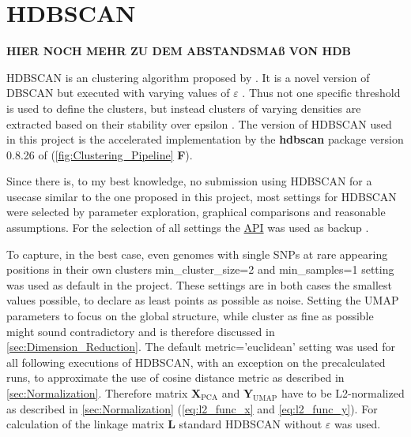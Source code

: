 \section{HDBSCAN} \label{sec:HDBSCAN}

\textbf{HIER NOCH MEHR ZU DEM ABSTANDSMAß VON HDB}

\gls{HDBSCAN} is an clustering algorithm proposed by \textcite{campello_hierarchical_2015, hutchison_density-based_2013}. It is a novel version of \gls{DBSCAN} but executed with varying values of $\varepsilon$ \autocite{hutchison_density-based_2013}. Thus not one specific threshold is used to define the clusters, but instead clusters of varying densities are extracted based on their stability over epsilon \autocite{mcinnes_hdbscan_2017}. The version of \gls{HDBSCAN} used in this project is the accelerated implementation by the \textbf{hdbscan} package version 0.8.26 of \textcite{mcinnes_accelerated_2017} (\autoref{fig:Clustering_Pipeline} \textsf{\textbf{F}}).

Since there is, to my best knowledge, no submission using \gls{HDBSCAN} for a usecase similar to the one proposed in this project, most settings for \gls{HDBSCAN} were selected by parameter exploration, graphical comparisons and reasonable assumptions. For the selection of all settings the \href{https://hdbscan.readthedocs.io/en/latest/api.html}{API} was used as backup \autocite{mcinnes_hdbscan_2017}. 

To capture, in the best case, even genomes with single \glspl{SNP} at rare appearing positions in their own clusters \colorbox{backcolour}{min\_cluster\_size=2} and \colorbox{backcolour}{min\_samples=1} setting was used as default in the project. These settings are in both cases the smallest values possible, to declare as least points as possible as noise. Setting the \gls{UMAP} parameters to focus on the global structure, while cluster as fine as possible might sound contradictory and is therefore discussed in \autoref{sec:Dimension_Reduction}. The default \colorbox{backcolour}{metric='euclidean'} setting was used for all following executions of \gls{HDBSCAN}, with an exception on the precalculated runs, to approximate the use of cosine distance metric as described in \autoref{sec:Normalization}. Therefore matrix $\mathbf{X}_{\text{PCA}}$ and $\mathbf{Y}_{\text{UMAP}}$ have to be L2-normalized as described in \autoref{sec:Normalization} (\autoref{eq:l2_func_x} and \autoref{eq:l2_func_y}). For calculation of the linkage matrix $\mathbf{L}$ standard \gls{HDBSCAN} without $\varepsilon$ was used.

